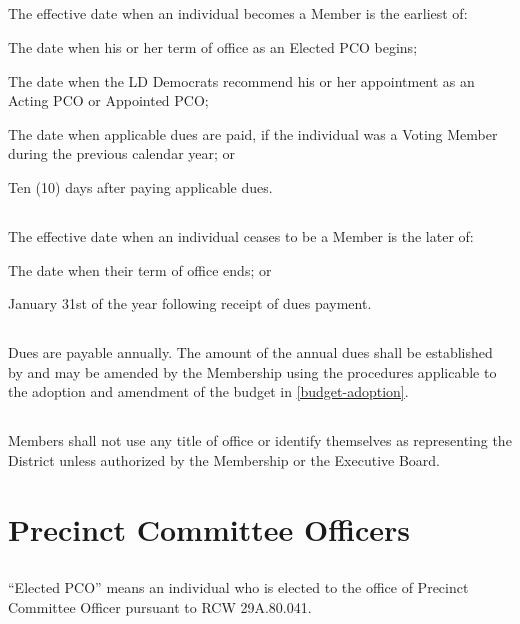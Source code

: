 \subsection{}
The effective date when an individual becomes a Member is the earliest of:
\begin{alphalist}
    \item The date when his or her term of office as an Elected PCO begins;
    \item The date when the \fortythird{} LD Democrats recommend his or her appointment as an Acting PCO or
Appointed PCO;
    \item The date when applicable dues are paid, if the individual was a Voting Member during the previous
calendar year; or
    \item Ten (10) days after paying applicable dues.
\end{alphalist}

\subsection{}
The effective date when an individual ceases to be a Member is the later of:
\begin{alphalist}
    \item The date when their term of office ends; or
    \item January 31st of the year following receipt of dues payment.
\end{alphalist}

\subsection{}
Dues are payable annually. The amount of the annual dues shall be established by and may be amended by the Membership using the procedures applicable to the adoption and amendment of the budget in \autoref{budget-adoption}.

\subsection{}
Members shall not use any title of office or identify themselves as representing the \fortythird{} District unless authorized by the Membership or the Executive Board.

\section{Precinct Committee Officers}
\subsection{} \label{elected-pco}
“Elected PCO” means an individual who is elected to the office of Precinct Committee Officer pursuant to RCW 29A.80.041.

